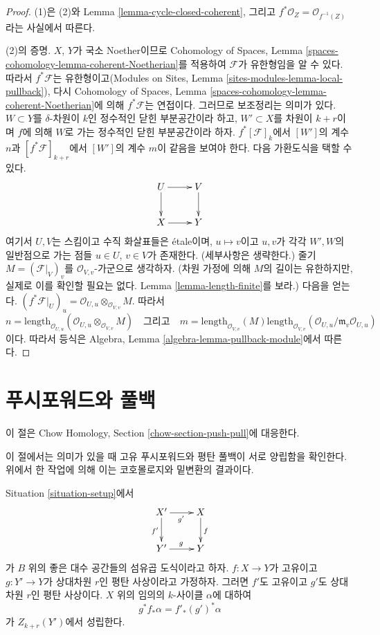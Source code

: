 \begin{proof}
(1)은 (2)와 Lemma \ref{lemma-cycle-closed-coherent}, 그리고
$f^*\mathcal{O}_Z = \mathcal{O}_{f^{-1}(Z)}$라는 사실에서 따른다.

\medskip\noindent
(2)의 증명.
$X$, $Y$가 국소 Noether이므로 Cohomology of Spaces, Lemma
\ref{spaces-cohomology-lemma-coherent-Noetherian}를 적용하여
$\mathcal{F}$가 유한형임을 알 수 있다. 따라서
$f^*\mathcal{F}$는 유한형이고(Modules on Sites, Lemma
\ref{sites-modules-lemma-local-pullback}), 다시 Cohomology of Spaces,
Lemma \ref{spaces-cohomology-lemma-coherent-Noetherian}에 의해
$f^*\mathcal{F}$는 연접이다. 그러므로 보조정리는 의미가 있다.
$W \subset Y$를 $\delta$-차원이 $k$인 정수적인 닫힌 부분공간이라 하고,
$W' \subset X$를 차원이 $k + r$이며 $f$에 의해 $W$로 가는 정수적인
닫힌 부분공간이라 하자. $f^*[{\mathcal F}]_k$에서 $[W']$의 계수
$n$과 $[f^*{\mathcal F}]_{k+r}$에서 $[W']$의 계수 $m$이 같음을
보여야 한다. 다음 가환도식을 택할 수 있다.
$$
\xymatrix{
U \ar[d] \ar[r] & V \ar[d] \\
X \ar[r] & Y
}
$$
여기서 $U, V$는 스킴이고 수직 화살표들은 \'etale이며,
$u \mapsto v$이고 $u, v$가 각각 $W', W$의 일반점으로 가는 점들
$u \in U$, $v \in V$가 존재한다. (세부사항은 생략한다.)
줄기 $M = (\mathcal{F}|_V)_v$를 $\mathcal{O}_{V, v}$-가군으로
생각하자. (차원 가정에 의해 $M$의 길이는 유한하지만, 실제로 이를
확인할 필요는 없다. Lemma \ref{lemma-length-finite}를 보라.)
다음을 얻는다.
$(f^*\mathcal{F}|_U)_u = \mathcal{O}_{U, u} \otimes_{\mathcal{O}_{V, v}} M$.
따라서
$$
n = \text{length}_{\mathcal{O}_{U, u}}
(\mathcal{O}_{U, u} \otimes_{\mathcal{O}_{V, v}} M)
\quad
\text{그리고}
\quad
m = \text{length}_{\mathcal{O}_{V, v}}(M)
\text{length}_{\mathcal{O}_{V, v}}(
\mathcal{O}_{U, u}/\mathfrak m_v \mathcal{O}_{U, u})
$$
이다. 따라서 등식은 Algebra, Lemma
\ref{algebra-lemma-pullback-module}에서 따른다.
\end{proof}

\section{푸시포워드와 풀백}
\label{section-push-pull}

\noindent
이 절은 Chow Homology, Section \ref{chow-section-push-pull}에 대응한다.

\medskip\noindent
이 절에서는 의미가 있을 때 고유 푸시포워드와 평탄 풀백이 서로 양립함을
확인한다. 위에서 한 작업에 의해 이는 코호몰로지와 밑변환의 결과이다.

\begin{lemma}
\label{lemma-flat-pullback-proper-pushforward}
Situation \ref{situation-setup}에서
$$
\xymatrix{
X' \ar[r]_{g'} \ar[d]_{f'} & X \ar[d]^f \\
Y' \ar[r]^g & Y
}
$$
가 $B$ 위의 좋은 대수 공간들의 섬유곱 도식이라고 하자.
$f : X \to Y$가 고유이고 $g : Y' \to Y$가 상대차원 $r$인 평탄
사상이라고 가정하자. 그러면 $f'$도 고유이고 $g'$도 상대차원 $r$인
평탄 사상이다. $X$ 위의 임의의 $k$-사이클 $\alpha$에 대하여
$$
g^*f_*\alpha = f'_*(g')^*\alpha
$$
가 $Z_{k + r}(Y')$에서 성립한다.
\end{lemma}

